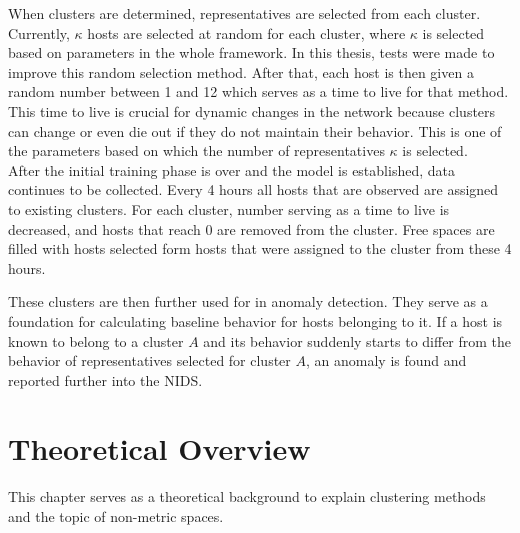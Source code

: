 \documentclass[thesis=B,english]{FITthesis}[2012/10/20]
\begin{document}
When clusters are determined, representatives are selected from each cluster.
Currently, $\kappa$ hosts are selected at random for each cluster, where $\kappa$ is selected based on parameters in the whole framework.                       
In this thesis, tests were made to improve this random selection method.
After that, each host is then given a random number between 1 and 12 which serves as a time to live for that method. 
This time to live is crucial for dynamic changes in the network because clusters can change or even die out if they do not maintain their behavior.
This is one of the parameters based on which the number of representatives $\kappa$ is selected. \\
                                                                                  
After the initial training phase is over and the model is established, data continues to be collected.
Every 4 hours all hosts that are observed are assigned to existing clusters.
For each cluster, number serving as a time to live is decreased, and hosts that reach 0 are removed from the cluster.
Free spaces are filled with hosts selected form hosts that were assigned to the cluster from these 4 hours.

These clusters are then further used for in anomaly detection.                    
They serve as a foundation for calculating baseline behavior for hosts belonging to it.
If a host is known to belong to a cluster $A$ and its behavior suddenly starts to differ from the behavior of representatives selected for cluster $A$, an anomaly is found and reported further into the NIDS.


\chapter{Theoretical Overview}

This chapter serves as a theoretical background to explain clustering methods and the topic of non-metric spaces.
                                                                                  
\end{document}
